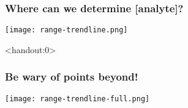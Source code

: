 \documentclass[handout]{beamer}
\begin{document}
%	


%
%
%
%

\begin{frame}
	\frametitle{Where can we determine [analyte]?}
		\texttt{[image: range-trendline.png]}
\end{frame}

\begin{frame}<handout:0>
	\frametitle{Be wary of points beyond!}
	\texttt{[image: range-trendline-full.png]}
\end{frame}
\end{document}
